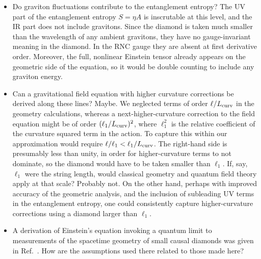 \documentclass[aps,prd,twocolumn,showpacs,groupedaddress,nofootinbib,longbibliography]{revtex4-1}
\begin{document}
\begin{itemize}

\item Do graviton fluctuations contribute to the entanglement entropy? 
The UV part of the entanglement entropy $S=\eta A$ is inscrutable  at this level,
and the IR part does not include gravitons. Since the diamond is taken much smaller than the wavelength of any ambient gravitons, 
they have no gauge-invariant meaning in the diamond. In the RNC gauge they are absent at first derivative order.
Moreover, the full, nonlinear Einstein tensor already appears on the geometric side of the equation, 
so it would be double counting to include any graviton energy. 

\item Can a gravitational field equation with higher curvature corrections be derived along these lines? Maybe.  
We neglected terms of order $\ell/L_{\rm curv}$ in the geometry calculations, whereas a next-higher-curvature correction to the field equation might be of order $(\ell_1/L_{\rm curv})^2$, where $\ell_1^2$ is the relative coefficient of the curvature squared term in the action. To capture this within our approximation would require $\ell/\ell_1<\ell_1/L_{\rm curv}$. The right-hand side is presumably less than unity, in order for higher-curvature terms to not dominate, so the diamond would have to be taken smaller than $\ell_1$.  If, say, $\ell_1$ were the string length,
would classical geometry and quantum field theory apply at that scale? Probably not. On the other hand, perhaps with improved accuracy of the geometric analysis, and the inclusion of subleading UV terms in the entanglement entropy, one could consistently capture higher-curvature corrections using a diamond larger than $\ell_1$.


\item A derivation of Einstein's equation invoking a quantum limit to measurements of the spacetime geometry of small causal diamonds was given in Ref.~\cite{Lloyd:2012du}. How are the assumptions used there related to those made here?


\end{itemize}
\end{document}
